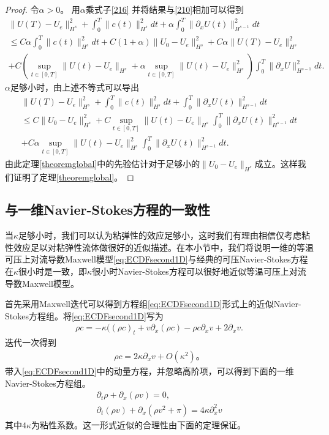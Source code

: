 \begin{proof}
令$\alpha>0$。 用$\alpha$乘式子\eqref{216} 并将结果与\eqref{210}相加可以得到
\begin{eqnarray*}
  \|U(T)-U_e\|_{H^s}^2 + \int_0^T \|c(t)\|_{H^s}^2 dt + \alpha \int_0^T \|\partial_x U(t)\|_{H^{s-1}}^2 dt \\
  \le C \alpha \int_0^T \|c(t)\|_{H^s}^2 dt +C(1+\alpha)\|U_0 -U_e\|_{H^s}^2 + C \alpha \|U(T)-U_e\|_{H^s}^2  \\ + C(\sup_{t \in [0,T]} \|U(t)-U_e\|_{H^s} + \alpha \sup_{t \in [0,T]} \|U(t)-U_e\|_{H^s}^2)  \int_0^T \|\partial_x U\|_{H^{s-1}}^2 dt.
\end{eqnarray*}
$\alpha$足够小时，由上述不等式可以导出
\begin{eqnarray*}
  \|U(T)-U_e\|_{H^s}^2 + \int_0^T \|c(t)\|_{H^s}^2 dt + \int_0^T \|\partial_x U(t)\|_{H^{s-1}}^2 dt \\
  \le C \|U_0-U_e\|_{H^s}^2 + C \sup_{t \in [0,T]} \|U(t)-U_e\|_{H^s} \int_0^T \|\partial_x U(t)\|_{H^{s-1}}^2 dt \\
  +C\alpha  \sup_{t \in [0,T]} \|U(t)-U_e\|_{H^s}^2 \int_0^T \|\partial_x U(t)\|_{H^{s-1}}^2 dt.
\end{eqnarray*}
由此定理\ref{theoremglobal}中的先验估计对于足够小的$\|U_0 -U_e\|_{H^s}$成立。这样我们证明了定理\ref{theoremglobal}。
\end{proof}

\subsection{与一维Navier-Stokes方程的一致性}

当$\kappa$足够小时，我们可以认为粘弹性的效应足够小，这时我们有理由相信仅考虑粘性效应足以对粘弹性流体做很好的近似描述。在本小节中，我们将说明一维的等温可压上对流导数Maxwell模型\eqref{eq:ECDFsecond1D}与经典的可压Navier-Stokes方程在$\kappa$很小时是一致，即$\kappa$很小时Navier-Stokes方程可以很好地近似等温可压上对流导数Maxwell模型。

首先采用Maxwell迭代可以得到方程组\eqref{eq:ECDFsecond1D}形式上的近似Navier-Stokes方程组。将\eqref{eq:ECDFsecond1D}写为
\begin{eqnarray*}
 \rho c= -\kappa(( \rho c)_t + v \partial_x (\rho c) -  \rho c \partial_x v + 2 \partial_x v.
\end{eqnarray*}
迭代一次得到
\begin{eqnarray*}
  \rho c = 2 \kappa \partial_x v + O(\kappa^2)。
\end{eqnarray*}
带入\eqref{eq:ECDFsecond1D}中的动量方程，并忽略高阶项，可以得到下面的一维Navier-Stokes方程组。
\begin{align}\label{51}
  \partial_t \rho + \partial_x (\rho v ) = 0, \nonumber \\
  \partial_t (\rho v) + \partial_x( \rho v^2 + \pi) = 4 \kappa \partial^2_x v
\end{align}
其中$4\kappa$为粘性系数。这一形式近似的合理性由下面的定理保证。

